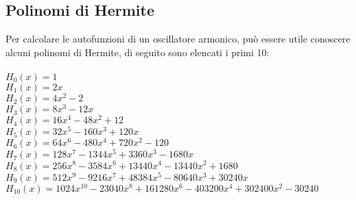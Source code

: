 \documentclass{article}
\begin{document}
\subsection{Polinomi di Hermite}
Per calcolare le autofunzioni di un oscillatore armonico, può essere utile conoscere alcuni polinomi di Hermite, di seguito sono elencati i primi 10:\\\\
$H_0(x) = 1$\\
$H_1(x) = 2x$\\
$H_2(x) = 4x^2 - 2$\\
$H_3(x) = 8x^3 - 12x$\\
$H_4(x) = 16x^4 - 48x^2 + 12$\\
$H_5(x) = 32x^5 - 160x^3 + 120x$\\
$H_6(x) = 64x^6 - 480x^4 + 720x^2 - 120$\\
$H_7(x) = 128x^7 - 1344x^5 + 3360x^3 - 1680x$\\
$H_8(x) = 256x^8 - 3584x^6 + 13440x^4 - 13440x^2 + 1680$\\
$H_9(x) = 512x^9 - 9216x^7 + 48384x^5 - 80640x^3 + 30240x$\\
$H_{10}(x) = 1024x^{10} - 23040x^8 + 161280x^6 - 403200x^4 + 302400x^2 - 30240$\\






\Index
\end{document}
